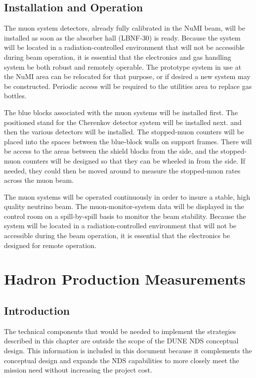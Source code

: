 \subsection{Installation and Operation}

The muon system detectors, already fully calibrated in the NuMI beam,
will be installed as soon as the absorber hall (LBNF-30) is ready.
Because the system will be located in a radiation-controlled
environment that will not be accessible during beam operation, it is
essential that the electronics and gas handling system be both robust
and remotely operable.  The prototype system in use at the NuMI area can be relocated for that purpose,
or if desired a new system may be constructed.
Periodic access will be required to the utilities area to replace gas bottles.

The blue blocks associated with the muon systems will be installed first.
The positioned stand for the Cherenkov detector system will be installed next.
and then the various detectors will be installed.
The stopped-muon counters will be placed into the spaces between the blue-block walls on
support frames.   There will be access to the areas between the shield blocks 
from the side, and the stopped-muon counters will be designed so that they can 
be wheeled in from the side.  If needed, they could then be moved around to measure
the stopped-muon rates across the muon beam.

The muon systems will be operated continuously in order to insure a stable,
high quality neutrino beam.
The muon-monitor-system data will be displayed in the control room on
a spill-by-spill basis to monitor the beam stability. Because the
system will be located in a radiation-controlled environment that will
not be accessible during the beam operation, it is essential that the
electronics be designed for remote operation.

\section{Hadron Production Measurements}
\label{sec:detectors-nd-ref-hadron}

\subsection{Introduction}

The technical components that would be needed to implement the strategies 
described in this chapter are outside the scope of the DUNE NDS conceptual 
design. This information is included in this document because it complements the conceptual 
design and expands the NDS capabilities to more closely meet the mission need without increasing the project cost.


